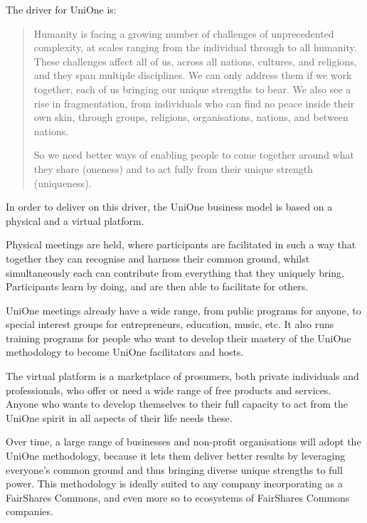 The driver for UniOne is:
\begin{quote}
Humanity is facing a growing number of challenges of unprecedented complexity, at scales ranging from the individual through to all humanity. These challenges affect all of us, across all nations, cultures, and religions, and they span multiple disciplines. We can only address them if we work together, each of us bringing our unique strengths to bear. We also see a rise in fragmentation, from individuals who can find no peace inside their own skin, through groups, religions, organisations, nations, and between nations.


\noindent So we need better ways of enabling people to come together around what they share (oneness) and to act fully from their unique strength (uniqueness).
\end{quote}


In order to deliver on this driver, the UniOne  business model is based on a physical and a virtual platform.


Physical meetings are held, where participants are facilitated in such a way that together they can recognise and harness their common ground, whilst simultaneously each can contribute from everything that they uniquely bring. Participants learn by doing, and are then able to facilitate for others.


UniOne meetings already have a wide range, from public programs for anyone, to special interest groups for entrepreneurs, education, music, etc. It also runs training programs for people who want to develop their mastery of the UniOne methodology to become UniOne facilitators and hosts.


The virtual platform is a marketplace of prosumers, both private individuals and professionals, who offer or need a wide range of free products and services. Anyone who wants to develop themselves to their full capacity to act from the UniOne spirit in all aspects of their life needs these.


Over time, a large range of businesses and non-profit organisations will adopt the UniOne methodology, because it lets them deliver better results by leveraging everyone's common ground and thus bringing diverse unique strengths to full power. This methodology is ideally suited to any company incorporating as a FairShares Commons, and even more so to ecosystems of FairShares Commons companies.


